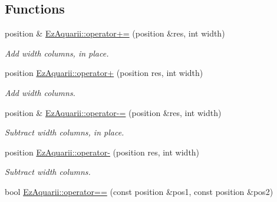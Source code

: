 \subsection*{Functions}
\begin{DoxyCompactItemize}
\item 
position \& \hyperlink{position_8hh_a776075db5d575173cee3477cf52a3d2f}{Ez\+Aquarii\+::operator+=} (position \&res, int width)\hypertarget{position_8hh_a776075db5d575173cee3477cf52a3d2f}{}\label{position_8hh_a776075db5d575173cee3477cf52a3d2f}

\begin{DoxyCompactList}\small\item\em Add {\itshape width} columns, in place. \end{DoxyCompactList}\item 
position \hyperlink{position_8hh_a1a49e31b514d7012a1e56e2f42d93743}{Ez\+Aquarii\+::operator+} (position res, int width)\hypertarget{position_8hh_a1a49e31b514d7012a1e56e2f42d93743}{}\label{position_8hh_a1a49e31b514d7012a1e56e2f42d93743}

\begin{DoxyCompactList}\small\item\em Add {\itshape width} columns. \end{DoxyCompactList}\item 
position \& \hyperlink{position_8hh_abfbf651c0a1357fc5f626fd22e7b854a}{Ez\+Aquarii\+::operator-\/=} (position \&res, int width)\hypertarget{position_8hh_abfbf651c0a1357fc5f626fd22e7b854a}{}\label{position_8hh_abfbf651c0a1357fc5f626fd22e7b854a}

\begin{DoxyCompactList}\small\item\em Subtract {\itshape width} columns, in place. \end{DoxyCompactList}\item 
position \hyperlink{position_8hh_a6b30baed1df233c7097b6b86425a7c67}{Ez\+Aquarii\+::operator-\/} (position res, int width)\hypertarget{position_8hh_a6b30baed1df233c7097b6b86425a7c67}{}\label{position_8hh_a6b30baed1df233c7097b6b86425a7c67}

\begin{DoxyCompactList}\small\item\em Subtract {\itshape width} columns. \end{DoxyCompactList}\item 
bool \hyperlink{position_8hh_aed0a9ce66c088e9abfa60cdf7a26bac6}{Ez\+Aquarii\+::operator==} (const position \&pos1, const position \&pos2)\hypertarget{position_8hh_aed0a9ce66c088e9abfa60cdf7a26bac6}{}\label{position_8hh_aed0a9ce66c088e9abfa60cdf7a26bac6}


\end{DoxyCompactItemize}
